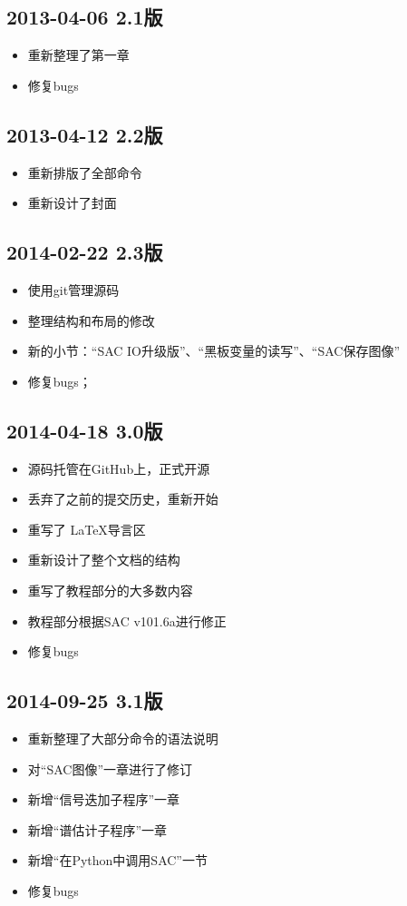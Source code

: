 \subsection*{2013-04-06 2.1版}
\begin{itemize}
\item 重新整理了第一章
\item 修复bugs
\end{itemize}

\subsection*{2013-04-12 2.2版}
\begin{itemize}
\item 重新排版了全部命令
\item 重新设计了封面
\end{itemize}

\subsection*{2014-02-22 2.3版}
\begin{itemize}
\item 使用git管理源码
\item 整理结构和布局的修改
\item 新的小节：``SAC IO升级版''、``黑板变量的读写''、``SAC保存图像''
\item 修复bugs；
\end{itemize}

\subsection*{2014-04-18 3.0版}
\begin{itemize}
\item 源码托管在GitHub上，正式开源
\item 丢弃了之前的提交历史，重新开始
\item 重写了 \LaTeX 导言区
\item 重新设计了整个文档的结构
\item 重写了教程部分的大多数内容
\item 教程部分根据SAC v101.6a进行修正
\item 修复bugs
\end{itemize}

\subsection*{2014-09-25 3.1版}
\begin{itemize}
\item 重新整理了大部分命令的语法说明
\item 对``SAC图像''一章进行了修订
\item 新增``信号迭加子程序''一章
\item 新增``谱估计子程序''一章
\item 新增``在Python中调用SAC''一节
\item 修复bugs
\end{itemize}


